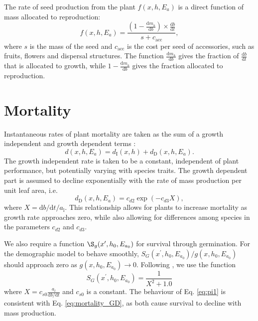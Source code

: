 \documentclass[10pt,twoside]{article}
\begin{document}
The rate of seed production from the plant \(f(x,h,E_a)\) is a direct
function of mass allocated to reproduction:
\begin{equation}\label{eq:fecundity}
f(x,h,E_a) = \frac{(1-\frac{\textrm{d}m_\textrm{a}}{\textrm{d}b}) \times \frac{\textrm{d}b}{\textrm{d}t}}{
  s + c_{\textrm{acc}}},
\end{equation}
where \(s\) is the mass of the seed and \(c_{\textrm{acc}}\) is the cost
per seed of accessories, such as fruits, flowers and dispersal
structures. The function $\frac{\textrm{d}m_\textrm{a}}{\textrm{d}b}$ gives the fraction
of $\frac{\textrm{d}b}{\textrm{d}t}$ that is allocated to growth, while 
$1-\frac{\textrm{d}m_\textrm{a}}{\textrm{d}b}$ gives the  fraction allocated
to reproduction.

\section{Mortality}\label{mortality}

Instantaneous rates of plant mortality are taken as the sum of a growth
independent and growth dependent terms
\citep{Falster-2011, Moorcroft-2001}:
\begin{equation}\label{eq:mortality}
d(x,h,E_a) = d_{\textrm{I}}(x,h) + d_{\textrm{D}}(x,h,E_a).
\end{equation}
The growth independent rate is taken to be a constant, independent of
plant performance, but potentially varying with species traits. The
growth dependent part is assumed to decline exponentially with the rate
of mass production per unit leaf area, i.e.
\begin{equation}\label{eq:mortality_GD}
d_{\textrm{D}}(x,h,E_a) =  c_{d2}  \exp(-c_{d3} X),
\end{equation}
where \(X = \textrm{d}b / \textrm{d}t / a_\textrm{l}\). This
relationship allows for plants to increase mortality as growth rate
approaches zero, while also allowing for differences among species in
the parameters \(c_{d2}\) and \(c_{d3}\).

We also require a function \(\S_g(x^\prime,h_0, E_{a_0})\) for survival
through germination. For the demographic model to behave smoothly, 
\(S_G (x^\prime,h_0, E_{a_0}) / g(x,h_0, E_{a_0})\) should approach zero as
\(g(x,h_0, E_{a_0}) \rightarrow 0\). Following \citep{Falster-2011},
we use the function
\begin{equation} \label{eq:pi1}
  S_G (x^\prime,h_0, E_{a_0}) = \frac1{X^2 + 1.0}
\end{equation}
where $X = c_{s0} \frac{a_l}{\textrm{d}b / \textrm{d}t}$ and $c_{s0}$ is a
constant. The behaviour of Eq. \ref{eq:pi1} is consistent with Eq. 
\ref{eq:mortality_GD}, as both cause survival to decline with mass production.
\end{document}
